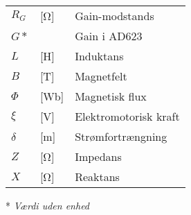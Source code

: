 \begin{table}[h!]
\begin{threeparttable}
\begin{tabular}{l l l}
$R_G$				&	[\si{\ohm}]					& Gain-modstands\\
$G*$				&								& Gain i AD623\\	
$L$					&	[\si{\henry}]				& Induktans\\
$B$					&	[\si{\tesla}]				& Magnetfelt\\
$\Phi$				&	[\si{\weber}]				& Magnetisk flux\\
$\xi$				&	[\si{\volt}]				& Elektromotorisk kraft\\
$\delta$			&	[\si{\m}]					& Strømfortrængning\\
$Z$					&	[\si{\ohm}]					& Impedans\\	
$X$					&	[\si{\ohm}]					& Reaktans\\
\bottomrule
\end{tabular}
\begin{tablenotes}
\item[*] \textit{Værdi uden enhed}
\end{tablenotes}
\end{threeparttable}
\end{table}




